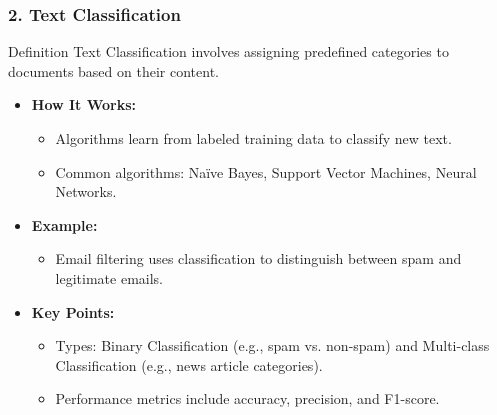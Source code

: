 \documentclass[aspectratio=169]{beamer}
\begin{document}
\begin{frame}[fragile]
    \frametitle{2. Text Classification}
    \begin{block}{Definition}
        Text Classification involves assigning predefined categories to documents based on their content.
    \end{block}
    \begin{itemize}
        \item \textbf{How It Works:}
        \begin{itemize}
            \item Algorithms learn from labeled training data to classify new text.
            \item Common algorithms: Naïve Bayes, Support Vector Machines, Neural Networks.
        \end{itemize}
        \item \textbf{Example:} 
        \begin{itemize}
            \item Email filtering uses classification to distinguish between spam and legitimate emails.
        \end{itemize}
        \item \textbf{Key Points:}
        \begin{itemize}
            \item Types: Binary Classification (e.g., spam vs. non-spam) and Multi-class Classification (e.g., news article categories).
            \item Performance metrics include accuracy, precision, and F1-score.
        \end{itemize}
    \end{itemize}
\end{frame}
\end{document}
